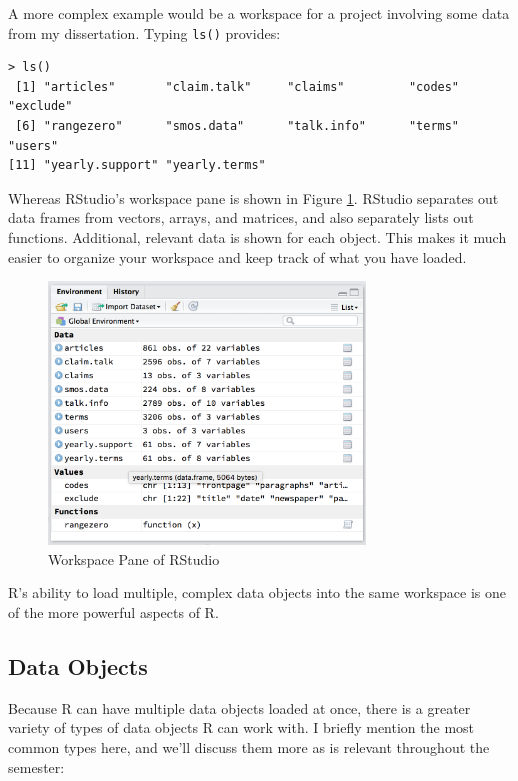 \documentclass[12pt, oneside]{amsart}   	%
\begin{document}
A more complex example would be a workspace for a project involving some data from my dissertation. Typing \texttt{ls()} provides:

\begin{lstlisting}
> ls()
 [1] "articles"       "claim.talk"     "claims"         "codes"          "exclude"       
 [6] "rangezero"      "smos.data"      "talk.info"      "terms"          "users"         
[11] "yearly.support" "yearly.terms"  
\end{lstlisting}

Whereas RStudio's workspace pane is shown in Figure \ref{fig:workspace2}. RStudio separates out data frames from vectors, arrays, and matrices, and also separately lists out functions. Additional, relevant data is shown for each object. This makes it much easier to organize your workspace and keep track of what you have loaded.

\begin{figure}[t]
\caption{Workspace Pane of RStudio}
\label{fig:workspace2}
\centering
\includegraphics[width=0.75\textwidth]{workspace2}
\end{figure}

R's ability to load multiple, complex data objects into the same workspace is one of the more powerful aspects of R. 

\subsection{Data Objects}

Because R can have multiple data objects loaded at once, there is a greater variety of types of data objects R can work with. I briefly mention the most common types here, and we'll discuss them more as is relevant throughout the semester:
\end{document}
